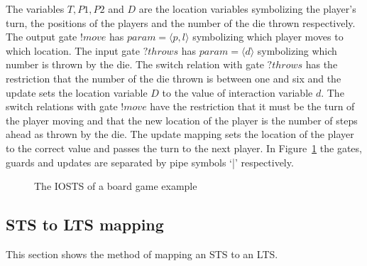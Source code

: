 The variables $T, P1, P2$ and $D$ are the location variables symbolizing the player's turn, the positions of the players and the number of the die thrown respectively. The output gate $!move$ has $param = \langle p, l\rangle$ symbolizing which player moves to which location. The input gate $\mathit{?throws}$ has $\mathit{param} = \langle d\rangle$ symbolizing which number is thrown by the die. The switch relation with gate $\mathit{?throws}$ has the restriction that the number of the die thrown is between one and six and the update sets the location variable $D$ to the value of interaction variable $d$. The switch relations with gate $!move$ have the restriction that it must be the turn of the player moving and that the new location of the player is the number of steps ahead as thrown by the die. The update mapping sets the location of the player to the correct value and passes the turn to the next player. In Figure~\ref{fig:example_sts} the gates, guards and updates are separated by pipe symbols `|' respectively.

\begin{figure}[ht]
  \begin{center}
    
  \end{center}
  \caption{The IOSTS of a board game example}
  \label{fig:example_sts}
\end{figure}

\subsection{STS to LTS mapping}\label{sec:sts_lts_trafo}
This section shows the method of mapping an STS to an LTS.

